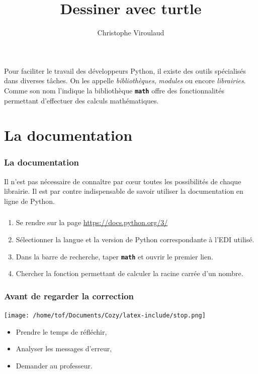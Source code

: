 \documentclass[svgnames,11pt]{beamer}
\author[]{Christophe Viroulaud}
\title{Dessiner avec turtle}
\date{\framebox{\textbf{Lang 04}}}
\institute{Première - NSI}
\begin{document}
\begin{frame}
\titlepage
\end{frame}
\begin{frame}
    \frametitle{}

    Pour faciliter le travail des développeurs Python, il existe des outils spécialisés dans diverses tâches. On les appelle \emph{bibliothèques}, \emph{modules} ou encore \emph{librairies}. Comme son nom l'indique la bibliothèque \textbf{\texttt{math}} offre des fonctionnalités permettant d'effectuer des calculs mathématiques.
\begin{center}
\end{center}
\end{frame}
\section{La documentation}
\begin{frame}
    \frametitle{La documentation}

    Il n'est pas nécessaire de connaître par cœur toutes les possibilités de chaque librairie. Il est par contre indispensable de savoir utiliser la documentation en ligne de Python.

\end{frame}
\begin{frame}
    \frametitle{}

    \begin{activite}
        \begin{enumerate}
            \item Se rendre sur la page \url{https://docs.python.org/3/}
            \item Sélectionner la langue et la version de Python correspondante à l'EDI utilisé.
            \item Dans la barre de recherche, taper \textbf{\texttt{math}} et ouvrir le premier lien.
            \item Chercher la fonction permettant de calculer la racine carrée d'un nombre.
            \end{enumerate}
    \end{activite}

\end{frame}
\begin{frame}
    \frametitle{Avant de regarder la correction}
\begin{center}
    \centering
    \texttt{[image: /home/tof/Documents/Cozy/latex-include/stop.png]}
    \end{center}
{\Large
    \begin{itemize}
        \item Prendre le temps de réfléchir,
        \item Analyser les messages d'erreur,
        \item Demander au professeur.
    \end{itemize}
}
\end{frame}
\end{document}
